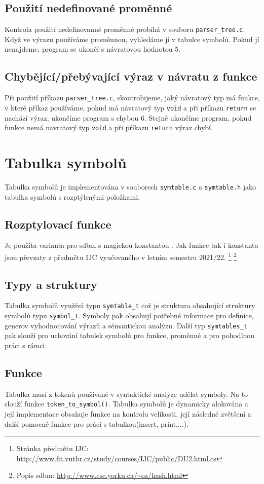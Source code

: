 \documentclass[11pt,a4paper]{article}
\begin{document}
\subsection{Použití nedefinované proměnné}
Kontrola použití nedefinovanné proměnné probíhá v souboru \verb|parser_tree.c|. Když ve výrazu používáme proměnnou, vyhledáme jí v tabulce symbolů. Pokud jí nenajdeme, program se ukončí s návratovou hodnotou 5.
\subsection{Chybějící/přebývající výraz v návratu z funkce}
Při použití příkazu \verb|parser_tree.c|, skontrolujeme, jaký návratový typ má funkce, v které příkaz používáme, pokud má návratový typ \verb|void| a při příkazu \verb|return| se nachází výraz, ukončíme program s chybou 6. Stejně ukončíme program, pokud funkce nemá navratový typ \verb|void| a při příkazu \verb|return| výraz chybí.

\pagebreak{}

\section{Tabulka symbolů}
Tabulka symbolů je implementována v souborech \verb|symtable.c| a \verb|symtable.h| jako  tabulka symbolů s rozptýlenými položkami.
\subsection{Rozptylovací funkce}
Je použita varianta pro sdbm s magickou konstantou . Jak funkce tak i konstanta jsou převzaty z předmětu IJC vyučovaného v letním semestru 2021/22.
\footnote{ Stránka předmětu IJC: \url{http://www.fit.vutbr.cz/study/courses/IJC/public/DU2.html.cs}}
\footnote{ Popis sdbm: \url{http://www.cse.yorku.ca/~oz/hash.html}}

\subsection{Typy a struktury}
Tabulka symbolů využívá typu \verb|symtable_t| což je struktura obsahující struktury symbolů typu \verb|symbol_t|. Symboly pak obsahují potřebné informace pro definice, generov vyhodnocování výrazů a sémantickou analýzu. Další typ \verb|symtables_t| pak slouží pro uchování tabulek symbolů pro funkce, proměnné a pro pohodlnou práci s rámci. 
\subsection{Funkce}
Tabulka musí z tokenů používané v syntaktické analýze udělat symboly. Na to slouží funkce \verb|token_to_symbol()|.
Tabulka symbolů je dynamicky alokována a její implementace obsahuje funkce na kontrolu velikosti, její následné zvětšení a další pomocné funkce pro prácí s tabulkou(insert, print,...). 
\end{document}
